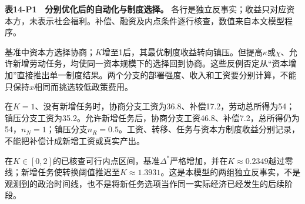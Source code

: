 \documentclass[UTF8,fontset=windows,12pt,a4paper,oneside,openany]{ctexbook}
\begin{document}
\textbf{表14-P1　分别优化后的自动化与制度选择。} 各行是独立反事实；收益只对应资本方，未表示社会福利。补偿、融资及内点条件逐行核查，数值来自本文模型程序。

基准中资本方选择协商；$K$增至1后，其最优制度收益转向镇压。但提高$\kappa$或$\chi$、允许新增劳动任务，均使同一资本规模下的选择回到协商。这些反例否定从“资本增加”直接推出单一制度结果。两个分支的部署强度、收入和工资要分别计算，不能只保持$x$相同而挑选较低政策费用。

在$K=1$、没有新增任务时，协商分支工资为36.8、补偿17.2，劳动总所得为54；镇压分支工资为35.2。允许新增任务后，协商分支工资46.8、补偿7.2，总所得仍为54，$n_N=1$；镇压分支$n_R=0.5$。工资、转移、任务与资本方制度收益分别记录，不能把补偿计成新增工资或真实产出。

在$K\in[0,2]$的已核查可行内点区间，基准$\Delta^*$严格增加，并在$K\approx0.2349$越过零线；新增任务使转换阈值推迟至$K\approx1.3931$。这是本模型的两组独立反事实，不是观测到的政治时间线，也不是将新任务选项当作同一实际经济已经发生的后续阶段。
\end{document}
